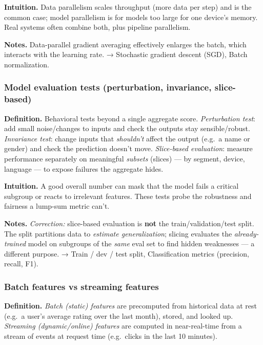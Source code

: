 \documentclass[
  10pt,
  letterpaper,
  onecolumn]{article}
\begin{document}
\textbf{Intuition.} Data parallelism scales throughput (more data per
step) and is the common case; model parallelism is for models too large
for one device's memory. Real systems often combine both, plus pipeline
parallelism.

\textbf{Notes.} Data-parallel gradient averaging effectively enlarges
the batch, which interacts with the learning rate. → Stochastic gradient
descent (SGD), Batch normalization.

\hypertarget{model-evaluation-tests-perturbation-invariance-slice-based}{%
\subsubsection{Model evaluation tests (perturbation, invariance,
slice-based)}\label{model-evaluation-tests-perturbation-invariance-slice-based}}

\textbf{Definition.} Behavioral tests beyond a single aggregate score.
\emph{Perturbation test}: add small noise/changes to inputs and check
the outputs stay sensible/robust. \emph{Invariance test}: change inputs
that \emph{shouldn't} affect the output (e.g.~a name or gender) and
check the prediction doesn't move. \emph{Slice-based evaluation}:
measure performance separately on meaningful \emph{subsets} (slices) ---
by segment, device, language --- to expose failures the aggregate hides.

\textbf{Intuition.} A good overall number can mask that the model fails
a critical subgroup or reacts to irrelevant features. These tests probe
the robustness and fairness a lump-sum metric can't.

\textbf{Notes.} \emph{Correction:} slice-based evaluation is
\textbf{not} the train/validation/test split. The split partitions data
to \emph{estimate generalization}; slicing evaluates the
\emph{already-trained} model on subgroups of the \emph{same} eval set to
find hidden weaknesses --- a different purpose. → Train / dev / test
split, Classification metrics (precision, recall, F1).

\hypertarget{batch-features-vs-streaming-features}{%
\subsubsection{Batch features vs streaming
features}\label{batch-features-vs-streaming-features}}

\textbf{Definition.} \emph{Batch (static) features} are precomputed from
historical data at rest (e.g.~a user's average rating over the last
month), stored, and looked up. \emph{Streaming (dynamic/online)
features} are computed in near-real-time from a stream of events at
request time (e.g.~clicks in the last 10 minutes).
\end{document}

